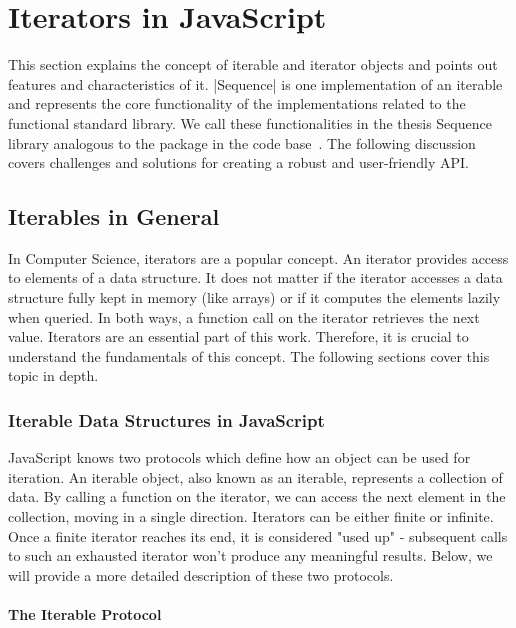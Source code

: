 \chapter{Iterators in JavaScript} %
\label{chap:Iterators in JavaScript}
This section explains the concept of iterable and iterator objects and points
out features and characteristics of it. |Sequence| is one implementation of
an iterable and represents the core functionality of the implementations
related to the functional standard library. We call these functionalities in
the thesis Sequence library analogous to the package in the code
base~\cite{wildwyss_kolibri}. The following
discussion covers challenges and solutions for creating a robust and
user-friendly API.

\section{Iterables in General}
\label{sec:Iterables in General}
In Computer Science, iterators are a popular concept. An iterator provides
access to elements of a data structure. It does not matter if the iterator
accesses a data structure fully kept in memory (like arrays) or if it computes
the elements lazily when queried. In both ways, a function call on the iterator
retrieves the next value. Iterators are an essential part of this work.
Therefore, it is crucial to understand the fundamentals of this concept. The
following sections cover this topic in depth.

\subsection{Iterable Data Structures in JavaScript}
\label{sub:Iterable data structures in JS}
JavaScript knows two protocols which define how an object can be used for
iteration. An iterable object, also known as an iterable, represents a
collection of data. By calling a function on the iterator, we can access the
next element in the collection, moving in a single direction. Iterators can be
either finite or infinite. Once a finite iterator reaches its end, it is
considered "used up" - subsequent calls to such an exhausted iterator won't
produce any meaningful results. Below, we will provide a more detailed
description of these two protocols.

\subsubsection{The Iterable Protocol}
\label{subsub:The Iterable Protocol}

